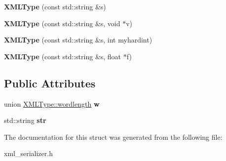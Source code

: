 \begin{DoxyCompactItemize}
\item 
{\bfseries X\+M\+L\+Type} (const std\+::string \&s)\hypertarget{structXMLType_a96cbdc3863bb0fb1811da3bd81e5613e}{}\label{structXMLType_a96cbdc3863bb0fb1811da3bd81e5613e}

\item 
{\bfseries X\+M\+L\+Type} (const std\+::string \&s, void $\ast$v)\hypertarget{structXMLType_a822e332f942410e6919b21bdf24bfcfd}{}\label{structXMLType_a822e332f942410e6919b21bdf24bfcfd}

\item 
{\bfseries X\+M\+L\+Type} (const std\+::string \&s, int myhardint)\hypertarget{structXMLType_ac436b18e1a2e0b3fde2945935c06fa25}{}\label{structXMLType_ac436b18e1a2e0b3fde2945935c06fa25}

\item 
{\bfseries X\+M\+L\+Type} (const std\+::string \&s, float $\ast$f)\hypertarget{structXMLType_ae7b31b459f4404bc26eae28f674a7e9a}{}\label{structXMLType_ae7b31b459f4404bc26eae28f674a7e9a}

\end{DoxyCompactItemize}
\subsection*{Public Attributes}
\begin{DoxyCompactItemize}
\item 
union \hyperlink{unionXMLType_1_1wordlength}{X\+M\+L\+Type\+::wordlength} {\bfseries w}\hypertarget{structXMLType_a08912b920b4580f70d84b1888b4d621d}{}\label{structXMLType_a08912b920b4580f70d84b1888b4d621d}

\item 
std\+::string {\bfseries str}\hypertarget{structXMLType_a14bf2c0375b751a8e37a373bb6d7f3cd}{}\label{structXMLType_a14bf2c0375b751a8e37a373bb6d7f3cd}

\end{DoxyCompactItemize}


The documentation for this struct was generated from the following file\+:\begin{DoxyCompactItemize}
\item 
xml\+\_\+serializer.\+h\end{DoxyCompactItemize}
